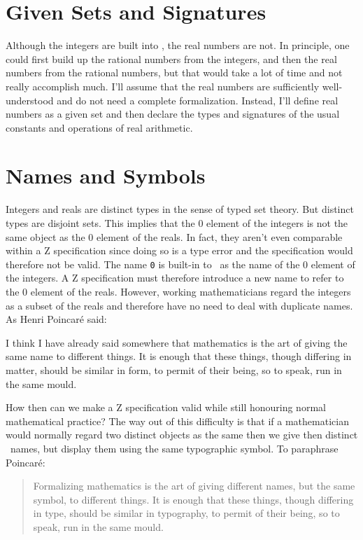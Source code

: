 \documentclass{amsart}
\begin{document}
\section{Given Sets and Signatures}

Although the integers are built into \ZN, the real numbers are not.
In principle, one could first build up the rational numbers from the integers,
and then the real numbers from the rational numbers, but that would take a lot of time and not really
accomplish much.
I'll assume that the real numbers are sufficiently well-understood and do not need a complete formalization.
Instead, I'll define real numbers as a given set and then declare the types and signatures of the usual constants and operations of real arithmetic.

\section{Names and Symbols}

Integers and reals are distinct types in the sense of typed set theory.
But distinct types are disjoint sets.
This implies that the $0$ element of the integers is not the same object as the $0$ element of the reals.
In fact, they aren't even comparable within a Z specification since doing so is a type error and the 
specification would therefore not be valid.
The name \texttt{0} is built-in to \ZN\  as the name of the $0$ element of the integers.
A Z specification must therefore introduce a new name to refer to the $0$ element of the reals.
However, working mathematicians regard the integers as a subset of the reals and therefore have no need to deal with duplicate names.
As Henri Poincar\'{e} \cite{poincare-fm} said:
\begin{displayquote}
I think I have already said somewhere that mathematics is the art of giving the same name to different things. 
It is enough that these things, though differing in matter, should be similar in form, to permit of their being, so to speak, run in the same mould.\end{displayquote}

How then can we make a Z specification valid while still honouring normal mathematical practice?
The way out of this difficulty is that if a mathematician would normally regard two distinct objects as the same
then we give then distinct \ZN\  names, but display them using the same typographic symbol.
To paraphrase Poincar\'{e}:
\begin{quote}
Formalizing mathematics is the art of giving different names, but the same symbol, to different things. 
It is enough that these things, though differing in type, should be similar in typography, 
to permit of their being, so to speak, run in the same mould.
\end{quote}
\end{document}
